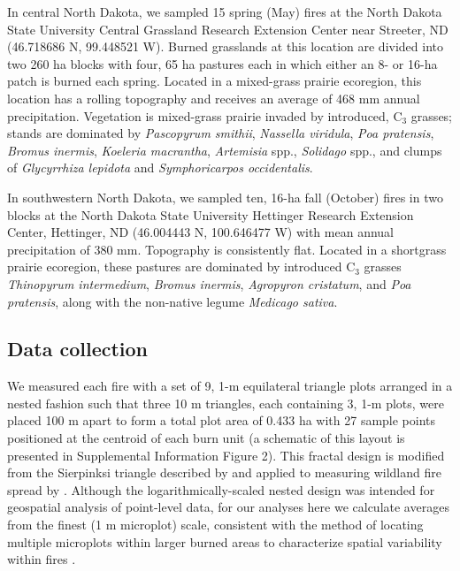 \documentclass[referee, 
		     sn-basic]{sn-jnl}
\begin{document}
\begin{linenumbers}
In central North Dakota, we sampled 15 spring (May) fires at the North
Dakota State University Central Grassland Research Extension Center near
Streeter, ND (46.718686 N, 99.448521 W). Burned grasslands at this
location are divided into two 260 ha blocks with four, 65 ha pastures
each in which either an 8- or 16-ha patch is burned each spring. Located
in a mixed-grass prairie ecoregion, this location has a rolling
topography and receives an average of 468 mm annual precipitation.
Vegetation is mixed-grass prairie invaded by introduced, C\(_3\)
grasses; stands are dominated by \emph{Pascopyrum smithii},
\emph{Nassella viridula}, \emph{Poa pratensis}, \emph{Bromus inermis},
\emph{Koeleria macrantha}, \emph{Artemisia} spp., \emph{Solidago} spp.,
and clumps of \emph{Glycyrrhiza lepidota} and \emph{Symphoricarpos
occidentalis}.

In southwestern North Dakota, we sampled ten, 16-ha fall (October) fires
in two blocks at the North Dakota State University Hettinger Research
Extension Center, Hettinger, ND (46.004443 N, 100.646477 W) with mean
annual precipitation of 380 mm. Topography is consistently flat. Located
in a shortgrass prairie ecoregion, these pastures are dominated by
introduced C\(_3\) grasses \emph{Thinopyrum intermedium}, \emph{Bromus
inermis}, \emph{Agropyron cristatum}, and \emph{Poa pratensis}, along
with the non-native legume \emph{Medicago sativa}.

\subsection{Data collection}

We measured each fire with a set of 9, 1-m equilateral triangle plots
arranged in a nested fashion such that three 10 m triangles, each
containing 3, 1-m plots, were placed 100 m apart to form a total plot
area of 0.433 ha with 27 sample points positioned at the centroid of
each burn unit (a schematic of this layout is presented in Supplemental
Information Figure 2). This fractal design is modified from the
Sierpinksi triangle described by \citet{dorrough2007} and applied to
measuring wildland fire spread by \citet{mcgranahan2021b}. Although the
logarithmically-scaled nested design was intended for geospatial
analysis of point-level data, for our analyses here we calculate
averages from the finest (1 m microplot) scale, consistent with the
method of locating multiple microplots within larger burned areas to
characterize spatial variability within fires \citep{fernandes2000}.


\end{linenumbers}
\end{document}
